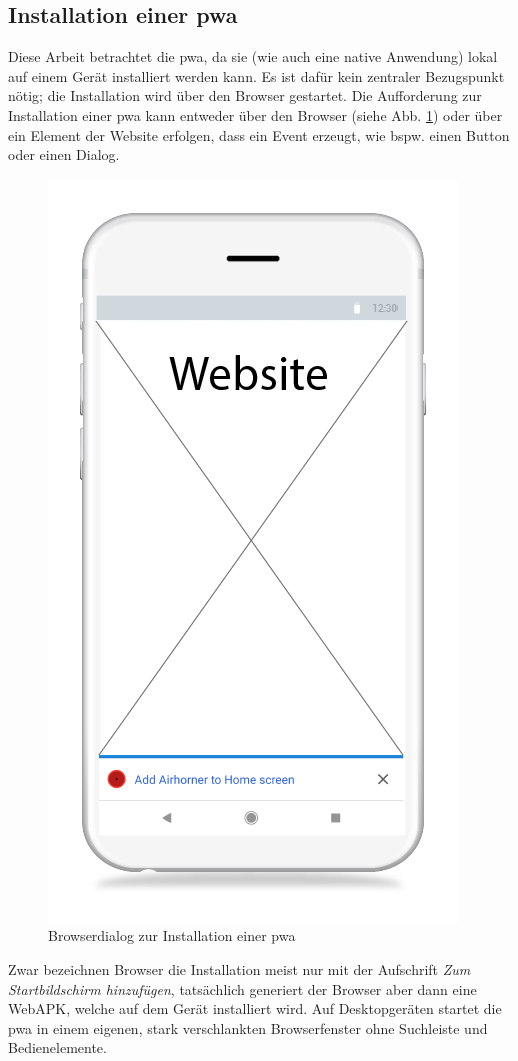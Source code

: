 \subsection{Installation einer \acf{pwa}}
Diese Arbeit betrachtet die \ac{pwa}, da sie (wie auch eine native Anwendung) lokal auf einem Gerät installiert werden kann. Es ist dafür kein zentraler Bezugspunkt nötig; die Installation wird über den Browser gestartet. Die Aufforderung zur Installation einer \ac{pwa} kann entweder über den Browser (siehe Abb. \ref{fig:pwainstallationprompt}) oder über ein Element der Website erfolgen, dass ein Event erzeugt, wie bspw. einen Button oder einen Dialog.

\begin{figure}[h!]
	\centering
	\includegraphics[width=0.5\linewidth]{img/fig/2-4-1_Install_PWA_Wireframe}
	\caption[Browserdialog zur Installation einer \ac{pwa}]{Browserdialog zur Installation einer \ac{pwa} \cite{PWAAddToHomeScreenPrompt}}
	\label{fig:pwainstallationprompt}
\end{figure}

\newpage
 

Zwar bezeichnen Browser die Installation meist nur mit der Aufschrift \textit{Zum Startbildschirm hinzufügen}, tatsächlich generiert der Browser aber dann eine WebAPK, welche auf dem Gerät installiert wird. Auf Desktopgeräten startet die \ac{pwa} in einem eigenen, stark verschlankten Browserfenster ohne Suchleiste und Bedienelemente. \cite{GooglePWAInstallation}


